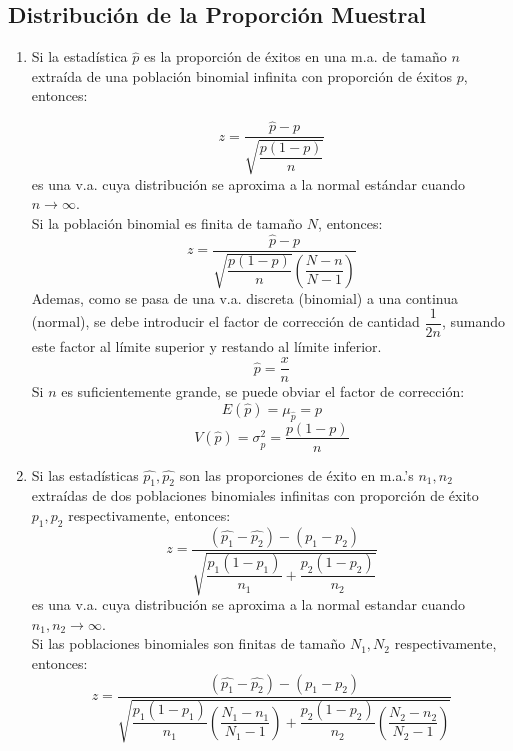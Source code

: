 \subsection{Distribución de la Proporción Muestral}
\begin{enumerate}[label=\textbf{(\Roman*)}]
\item Si la estadística $\widehat{p}$ es la proporción de éxitos en una m.a. de tamaño $n$ extraída de una población binomial infinita con proporción de éxitos $p$, entonces:

 $$z=\dfrac{\widehat{p}-p}{\sqrt{\dfrac{p(1-p)}{n}}}$$
 es una v.a. cuya distribución se aproxima a la normal estándar cuando $n\rightarrow\infty$. \\
 Si la población binomial es finita de tamaño $N$, entonces:
 $$z=\dfrac{\widehat{p}-p}{\sqrt{\dfrac{p(1-p)}{n}}\left(\dfrac{N-n}{N-1}\right)}$$
 Ademas, como se pasa de una v.a. discreta (binomial) a una continua (normal), se debe introducir el factor de corrección de cantidad $\dfrac{1}{2n}$, sumando este factor al límite superior y restando al límite inferior.
 $$\hat{p}=\dfrac{x}{n}$$
Si $n$ es suficientemente grande, se puede obviar el factor de corrección:
  $$E(\hat{p})=\mu_{\hat{p}}=p$$
  $$V(\hat{p})=\sigma_{\hat{p}}^2=\dfrac{p(1-p)}{n}$$
\item Si las estadísticas $\widehat{p_1},\widehat{p_2}$ son las proporciones de éxito en m.a.'s $n_1,n_2$ extraídas de dos poblaciones binomiales infinitas con proporción de éxito $p_1,p_2$ respectivamente, entonces:
$$z=\dfrac{(\hat{p_1}-\hat{p_2})-(p_1-p_2)}{\sqrt{\dfrac{p_1(1-p_1)}{n_1}+\dfrac{p_2(1-p_2)}{n_2}}}$$
es una v.a. cuya distribución se aproxima a la normal estandar cuando $n_1,n_2\rightarrow\infty$. \\
Si las poblaciones binomiales son finitas de tamaño $N_1,N_2$ respectivamente, entonces:
$$z=\dfrac{(\hat{p_1}-\hat{p_2})-(p_1-p_2)}{\sqrt{\dfrac{p_1(1-p_1)}{n_1}\left( \dfrac{N_1-n_1}{N_1-1}\right) +\dfrac{p_2(1-p_2)}{n_2}\left( \dfrac{N_2-n_2}{N_2-1}\right) }}$$
\end{enumerate}